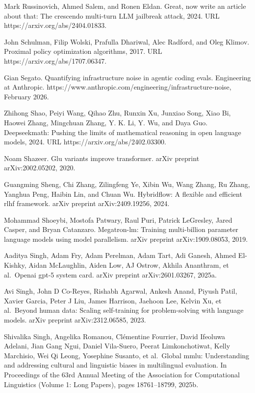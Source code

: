 Mark Russinovich, Ahmed Salem, and Ronen Eldan. Great, now write an
article about that: The crescendo multi-turn LLM jailbreak attack, 2024.
URL https://arxiv.org/abs/2404.01833.

John Schulman, Filip Wolski, Prafulla Dhariwal, Alec Radford, and Oleg
Klimov. Proximal policy optimization algorithms, 2017. URL
https://arxiv.org/abs/1707.06347.

Gian Segato. Quantifying infrastructure noise in agentic coding evals.
Engineering at Anthropic. https://www.anthropic.com/engineering/infrastructure-noise, February 2026.

Zhihong Shao, Peiyi Wang, Qihao Zhu, Runxin Xu, Junxiao Song, Xiao Bi,
Haowei Zhang, Mingchuan Zhang, Y. K. Li, Y. Wu, and Daya Guo.
Deepseekmath: Pushing the limits of mathematical reasoning in open
language models, 2024. URL https://arxiv.org/abs/2402.03300.

Noam Shazeer. Glu variants improve transformer. arXiv preprint
arXiv:2002.05202, 2020.

Guangming Sheng, Chi Zhang, Zilingfeng Ye, Xibin Wu, Wang Zhang, Ru
Zhang, Yanghua Peng, Haibin Lin, and Chuan Wu. Hybridflow: A flexible
and efficient rlhf framework. arXiv preprint arXiv:2409.19256, 2024.

Mohammad Shoeybi, Mostofa Patwary, Raul Puri, Patrick LeGresley, Jared
Casper, and Bryan Catanzaro. Megatron-lm: Training multi-billion
parameter language models using model parallelism. arXiv preprint
arXiv:1909.08053, 2019.

Aaditya Singh, Adam Fry, Adam Perelman, Adam Tart, Adi Ganesh, Ahmed
El-Kishky, Aidan McLaughlin, Aiden Low, AJ Ostrow, Akhila Ananthram, et
al.~Openai gpt-5 system card. arXiv preprint arXiv:2601.03267, 2025a.

Avi Singh, John D Co-Reyes, Rishabh Agarwal, Ankesh Anand, Piyush Patil,
Xavier Garcia, Peter J Liu, James Harrison, Jaehoon Lee, Kelvin Xu, et
al.~Beyond human data: Scaling self-training for problem-solving with
language models. arXiv preprint arXiv:2312.06585, 2023.

Shivalika Singh, Angelika Romanou, Clémentine Fourrier, David Ifeoluwa
Adelani, Jian Gang Ngui, Daniel Vila-Suero, Peerat Limkonchotiwat, Kelly
Marchisio, Wei Qi Leong, Yosephine Susanto, et al.~Global mmlu:
Understanding and addressing cultural and linguistic biases in
multilingual evaluation. In Proceedings of the 63rd Annual Meeting of
the Association for Computational Linguistics (Volume 1: Long Papers),
pages 18761--18799, 2025b.

